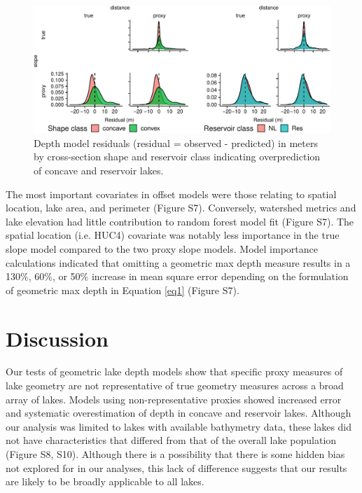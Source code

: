 \documentclass[draft]{agujournal2019}
\begin{document}
\begin{figure}
  \begin{center}
    \includegraphics[width=\textwidth,keepaspectratio]{../figures/02_depth_model_grid_resid-1}
  \end{center}
  \caption{Depth model residuals (residual  = observed - predicted) in meters by cross-section shape and reservoir class indicating overprediction of concave and reservoir lakes.}\label{fig3}
\end{figure}

The most important covariates in offset models were those relating to spatial location, lake area, and perimeter (Figure S7). Conversely, watershed metrics and lake elevation had little contribution to random forest model fit (Figure S7). The spatial location (i.e. HUC4) covariate was notably less importance in the true slope model compared to the two proxy slope models. Model importance calculations indicated that omitting a geometric max depth measure results in a 130\%, 60\%, or 50\% increase in mean square error depending on the formulation of geometric max depth in Equation \ref{eq1} (Figure S7).

\section{Discussion}
\noindent
Our tests of geometric lake depth models show that specific proxy measures of lake geometry are not representative of true geometry measures across a broad array of lakes. Models using non-representative proxies showed increased error and systematic overestimation of depth in concave and reservoir lakes. Although our analysis was limited to lakes with available bathymetry data, these lakes did not have characteristics that differed from that of the overall lake population (Figure S8, S10). Although there is a possibility that there is some hidden bias not explored for in our analyses, this lack of difference suggests that our results are likely to be broadly applicable to all lakes.
\end{document}
